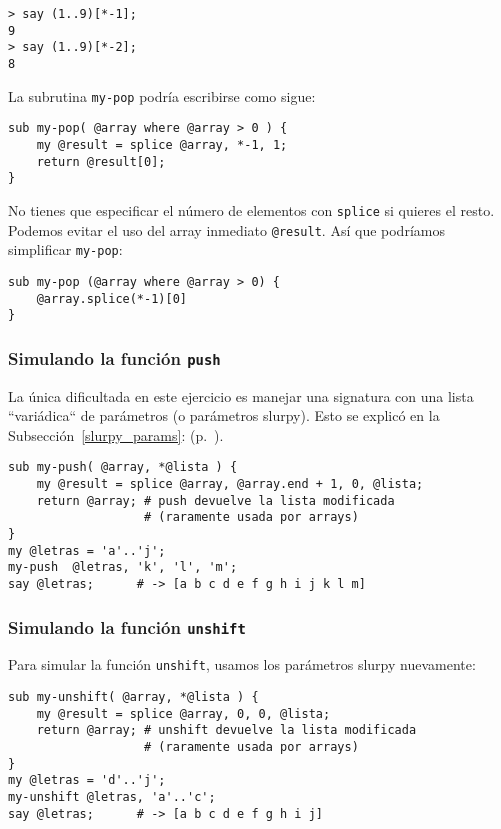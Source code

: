 \begin{verbatim}
> say (1..9)[*-1];
9
> say (1..9)[*-2];
8
\end{verbatim}

La subrutina {\tt my-pop} podría escribirse como sigue:

\begin{verbatim}
sub my-pop( @array where @array > 0 ) {
    my @result = splice @array, *-1, 1;
    return @result[0];
}
\end{verbatim}

No tienes que especificar el número de elementos con  
{\tt splice} si quieres el resto. Podemos evitar el uso
del array inmediato \verb'@result'. Así que podríamos
simplificar {\tt my-pop}:

\begin{verbatim}
sub my-pop (@array where @array > 0) {
    @array.splice(*-1)[0]
}
\end{verbatim}


\subsubsection{Simulando la función {\tt push}}

La única dificultada en este ejercicio es manejar una signatura 
con una lista ``variádica`` de parámetros (o parámetros slurpy).
Esto se explicó en la Subsección~\ref{slurpy_params}:
(p.~\pageref{slurpy_params}).

\begin{verbatim}
sub my-push( @array, *@lista ) {
    my @result = splice @array, @array.end + 1, 0, @lista;
    return @array; # push devuelve la lista modificada
                   # (raramente usada por arrays)
}
my @letras = 'a'..'j';
my-push  @letras, 'k', 'l', 'm';
say @letras;      # -> [a b c d e f g h i j k l m]
\end{verbatim}

\subsubsection{Simulando la función {\tt unshift}}

Para simular la función \verb|unshift|, usamos los parámetros
slurpy nuevamente:

\begin{verbatim}
sub my-unshift( @array, *@lista ) {
    my @result = splice @array, 0, 0, @lista;
    return @array; # unshift devuelve la lista modificada
                   # (raramente usada por arrays)
}
my @letras = 'd'..'j';
my-unshift @letras, 'a'..'c';
say @letras;      # -> [a b c d e f g h i j]
\end{verbatim}

